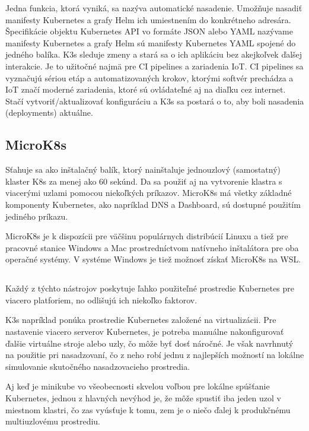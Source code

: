 Jedna funkcia, ktorá vyniká, sa nazýva automatické nasadenie. Umožňuje nasadiť manifesty Kubernetes a grafy Helm ich umiestnením do konkrétneho adresára. Špecifikácie objektu Kubernetes API vo formáte JSON alebo YAML nazývame manifesty Kubernetes a grafy Helm sú manifesty Kubernetes YAML spojené do jedného balíka. K3s sleduje zmeny a stará sa o ich aplikáciu bez akejkoľvek ďalšej interakcie. Je to užitočné najmä pre CI pipelines a zariadenia IoT. CI pipelines sa vyznačujú sériou etáp a automatizovaných krokov, ktorými softvér prechádza a IoT značí moderné zariadenia, ktoré sú ovládateľné aj na diaľku cez internet. Stačí vytvoriť/aktualizovať konfiguráciu a K3s sa postará o to, aby boli nasadenia (deployments) aktuálne.

\subsection*{MicroK8s}
Sťahuje sa ako inštalačný balík, ktorý nainštaluje jednouzlový (samostatný) klaster K8s za menej ako 60 sekúnd. Da sa použiť aj na vytvorenie klastra s viacerými uzlami pomocou niekoľkých príkazov. MicroK8s má všetky základné komponenty Kubernetes, ako napríklad DNS a Dashboard, sú dostupné použitím jediného príkazu.

MicroK8s je k dispozícii pre väčšinu populárnych distribúcií Linuxu a tiež pre pracovné stanice Windows a Mac prostredníctvom natívneho inštalátora pre oba operačné systémy. V systéme Windows je tiež možnosť získať MicroK8s na WSL.\cite{comparetool}

\subsection*{}

Každý z týchto nástrojov poskytuje ľahko použiteľné prostredie Kubernetes pre viacero platforiem, no odlišujú ich niekoľko faktorov.

K3s napríklad ponúka prostredie Kubernetes založené na virtualizácii. Pre nastavenie viacero serverov Kubernetes, je potreba manuálne nakonfigurovať ďalšie virtuálne stroje alebo uzly, čo môže byť dosť náročné. Je však navrhnutý na použitie pri nasadzovaní, čo z neho robí jednu z najlepších možností na lokálne simulovanie skutočného nasadzovacieho prostredia.

Aj keď je minikube vo všeobecnosti skvelou voľbou pre lokálne spúšťanie Kubernetes, jednou z hlavných nevýhod je, že môže spustiť iba jeden uzol v miestnom klastri, čo zas vyúsťuje k tomu, zem je o niečo ďalej k produkčnému multiuzlovému prostrediu.

